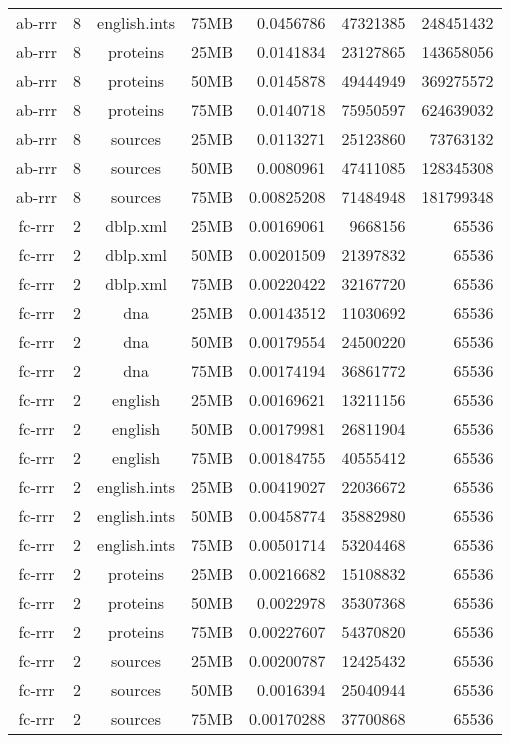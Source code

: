 \begin{table}[h]
\begin{center}
\begin{tabular}{ccccrrr}
ab-rrr & 8 & english.ints & 75MB & 0.0456786 & 47321385 & 248451432 \\
ab-rrr & 8 & proteins & 25MB & 0.0141834 & 23127865 & 143658056 \\
ab-rrr & 8 & proteins & 50MB & 0.0145878 & 49444949 & 369275572 \\
ab-rrr & 8 & proteins & 75MB & 0.0140718 & 75950597 & 624639032 \\
ab-rrr & 8 & sources & 25MB & 0.0113271 & 25123860 & 73763132 \\
ab-rrr & 8 & sources & 50MB & 0.0080961 & 47411085 & 128345308 \\
ab-rrr & 8 & sources & 75MB & 0.00825208 & 71484948 & 181799348 \\
fc-rrr & 2 & dblp.xml & 25MB & 0.00169061 & 9668156 & 65536 \\
fc-rrr & 2 & dblp.xml & 50MB & 0.00201509 & 21397832 & 65536 \\
fc-rrr & 2 & dblp.xml & 75MB & 0.00220422 & 32167720 & 65536 \\
fc-rrr & 2 & dna & 25MB & 0.00143512 & 11030692 & 65536 \\
fc-rrr & 2 & dna & 50MB & 0.00179554 & 24500220 & 65536 \\
fc-rrr & 2 & dna & 75MB & 0.00174194 & 36861772 & 65536 \\
fc-rrr & 2 & english & 25MB & 0.00169621 & 13211156 & 65536 \\
fc-rrr & 2 & english & 50MB & 0.00179981 & 26811904 & 65536 \\
fc-rrr & 2 & english & 75MB & 0.00184755 & 40555412 & 65536 \\
fc-rrr & 2 & english.ints & 25MB & 0.00419027 & 22036672 & 65536 \\
fc-rrr & 2 & english.ints & 50MB & 0.00458774 & 35882980 & 65536 \\
fc-rrr & 2 & english.ints & 75MB & 0.00501714 & 53204468 & 65536 \\
fc-rrr & 2 & proteins & 25MB & 0.00216682 & 15108832 & 65536 \\
fc-rrr & 2 & proteins & 50MB & 0.0022978 & 35307368 & 65536 \\
fc-rrr & 2 & proteins & 75MB & 0.00227607 & 54370820 & 65536 \\
fc-rrr & 2 & sources & 25MB & 0.00200787 & 12425432 & 65536 \\
fc-rrr & 2 & sources & 50MB & 0.0016394 & 25040944 & 65536 \\
fc-rrr & 2 & sources & 75MB & 0.00170288 & 37700868 & 65536 \\

\end{tabular}
\end{center}
\end{table}
